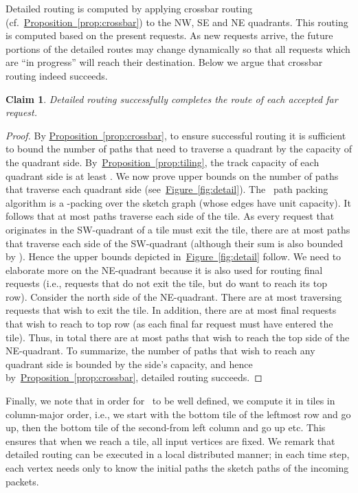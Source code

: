 \documentclass[11pt]{article}
\newtheorem{claim}[theorem]{Claim}
\newcommand{\namedref}[2]{\hyperref[#2]{#1~\ref*{#2}}}
\newcommand{\figref}[1]{\namedref{Figure}{#1}}
\newcommand{\propref}[1]{\namedref{Proposition}{#1}}
\newcommand{\route}{\text{\sc{ipp}}\xspace}
\newcommand{\IPP}{\route}
\newcommand{\detailedroute}{\text{\sc{detailed-route}}}
\newenvironment{proof sketch}[1]{\noindent {\emph{Proof sketch of #1:}}}{\hfill \qed}
\begin{document}
Detailed routing is computed by applying crossbar routing (cf.\
\propref{prop:crossbar}) to the NW, SE and NE quadrants. This routing is computed
based on the present requests.  As new requests arrive, the future portions of the
detailed routes may change dynamically so that all requests which are ``in
progress'' will reach their destination. Below we argue that crossbar routing indeed succeeds.
\begin{claim}
Detailed routing successfully completes the route of each accepted far request.
\end{claim}
\begin{proof}
By \propref{prop:crossbar}, to ensure successful routing
it is sufficient to bound the number of paths
that need to traverse a quadrant by the capacity of the
quadrant side.
  By~\propref{prop:tiling}, the track capacity of each quadrant side
  is at least .  We now prove upper bounds on the number of paths
  that traverse each quadrant side (see~\figref{fig:detail}).  The
  \IPP\ path packing algorithm is a -packing over the sketch graph
  (whose edges have unit capacity). It follows that at most  paths
  traverse each side of the tile.  As every request that originates in
  the SW-quadrant of a tile must exit the tile, there are at most 
  paths that traverse each side of the SW-quadrant (although their sum
  is also bounded by ).  Hence the upper bounds depicted
  in~\figref{fig:detail} follow. We need to elaborate more on the
  NE-quadrant because it is also used for routing final requests
  (i.e., requests that do not exit the tile, but do want to reach its
  top row). Consider the north side of the NE-quadrant. There are at
  most  traversing requests that wish to exit the tile. In
  addition, there are at most  final requests that wish to reach
  to top row (as each final far request must have entered the
  tile). Thus, in total there are at most  paths that wish to
  reach the top side of the NE-quadrant. To summarize, the number of
  paths that wish to reach any quadrant side is bounded by the side's
  capacity, and hence by~\propref{prop:crossbar}, detailed routing
  succeeds.
\end{proof}

Finally, we note that in order for \detailedroute\ to be well defined, we compute it
in tiles in column-major order, i.e., we start with the bottom tile of the leftmost
row and go up, then the bottom tile of the second-from left column and go up etc.
This ensures that when we reach a tile, all input vertices are fixed. We remark that
detailed routing can be executed in a local distributed manner; in each time step,
each vertex needs only to know the initial paths the sketch paths of the incoming
packets.
\end{document}
